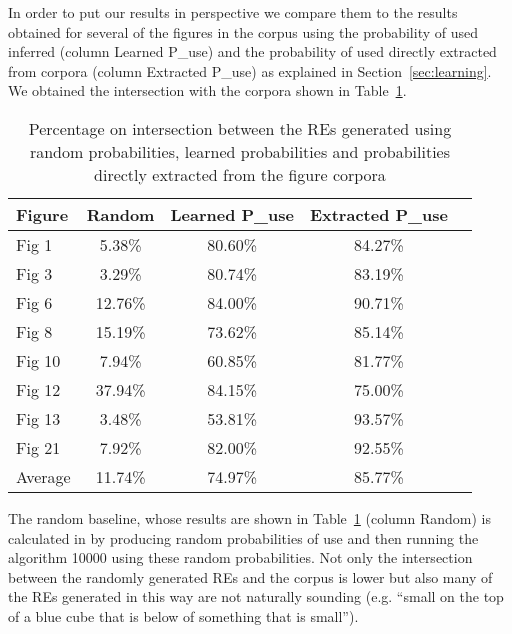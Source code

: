 In order to put our results in perspective we compare them to the results obtained for several of the figures in the corpus using the probability of used inferred (column Learned P_{use}) and the probability of used directly extracted from corpora (column Extracted P_{use}) as explained in Section~\ref{sec:learning}. We obtained the intersection with the corpora shown in Table~\ref{results-algo-all}. 

\begin{table}
\begin{center}
\begin{tabular}{|l|c|c|c|c|}
\hline
Figure & Random & Learned P_{use} & Extracted P_{use} \\
\hline
Fig 1 & 5.38\% & 80.60\% & 84.27\% \\
Fig 3 & 3.29\% & 80.74\% & 83.19\% \\
Fig 6 & 12.76\%	& 84.00\% & 90.71\% \\
Fig 8 & 15.19\%	& 73.62\% & 85.14\% \\
Fig 10 & 7.94\%	& 60.85\% & 81.77\% \\
Fig 12 & 37.94\% & 84.15\% & 75.00\% \\
Fig 13 & 3.48\%	& 53.81\% & 93.57\% \\
Fig 21 & 7.92\%	& 82.00\% & 92.55\% \\
\hline
Average	& 11.74\% & 74.97\% & 85.77\% \\
\hline
\end{tabular}
\caption{Percentage on intersection between the REs generated using random probabilities, learned probabilities and probabilities directly extracted from the figure corpora\label{results-algo-all}}
\end{center}
\end{table}

The random baseline, whose results are shown in Table~\ref{results-algo-all} (column Random) is calculated in by producing random probabilities of use and then running the algorithm 10000 using these random probabilities. Not only the intersection between the randomly generated REs and the corpus is lower but also many of  the REs generated in this way are not naturally sounding (e.g. ``small on the top of a blue cube that is below of something that is small''). 
